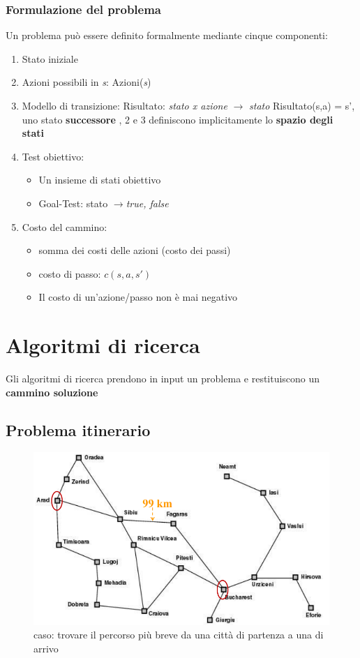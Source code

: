 \documentclass{article}
\begin{document}
\subsubsection{Formulazione del problema}
Un problema può essere definito formalmente mediante cinque componenti:
\begin{enumerate}
    \item Stato iniziale
    \item Azioni possibili in \textit{s}: Azioni(\textit{s})
    \item Modello di transizione:
    \newline Risultato: \textit{stato x azione} $\rightarrow$ \textit{stato}
    \newline Risultato(s,a) = s', uno stato \textbf{successore}
    , 2 e 3 definiscono implicitamente lo \textbf{spazio degli stati}
    \item Test obiettivo:
    \begin{itemize}
        \item Un insieme di stati obiettivo
        \item Goal-Test: stato $\rightarrow${\textit{true, false}}
    \end{itemize}
    \item Costo del cammino:
    \begin{itemize}
        \item somma dei costi delle azioni (costo dei passi)
        \item costo di passo: $c(s, a, s')$
        \item Il costo di un'azione/passo non è mai negativo
    \end{itemize}
\end{enumerate}

\section{Algoritmi di ricerca}
Gli algoritmi di ricerca prendono in input un problema e restituiscono un \textbf{cammino soluzione}
\subsection{Problema itinerario}
\begin{figure}
    \centering
    \includegraphics[width=\linewidth]{10.png}
    \caption{caso: trovare il percorso più breve da una città di partenza a una di arrivo}
    \label{fig:my_label}
\end{figure}
\end{document}
